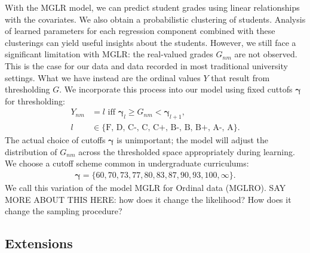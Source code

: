 \documentclass[10pt]{proc}
\begin{document}
With the MGLR model, we can predict student grades using linear relationships
with the covariates. We also obtain a probabilistic clustering of students.
Analysis of learned parameters for each regression component combined with
these clusterings can yield useful insights about the students. However, we
still face a significant limitation with MGLR: the real-valued grades $G_{nm}$
are not observed. This is the case for our data and data recorded in most
traditional university settings. What we have instead are the ordinal values
$Y$ that result from thresholding $G$. We incorporate this process into our
model using fixed cuttofs $\bm{\gamma}$ for thresholding:
%
\begin{align}
    Y_{nm} &= l \text{ iff } \bm{\gamma}_l \ge G_{nm} < \bm{\gamma}_{l+1}, \\
         l &\in \{\text{F, D, C-, C, C+, B-, B, B+, A-, A} \}.
\end{align}
%
The actual choice of cutoffs $\bm{\gamma}$ is unimportant; the model will adjust
the distribution of $G_{nm}$ across the thresholded space appropriately during
learning. We choose a cutoff scheme common in undergraduate curriculums:
%
\begin{align}
    \bm{\gamma} = \{ 60, 70, 73, 77, 80, 83, 87, 90, 93, 100, \infty \}.
\end{align}
%
We call this variation of the model MGLR for Ordinal data (MGLRO). SAY MORE
ABOUT THIS HERE: how does it change the likelihood? How does it change the
sampling procedure?

\subsection{Extensions}
\end{document}
